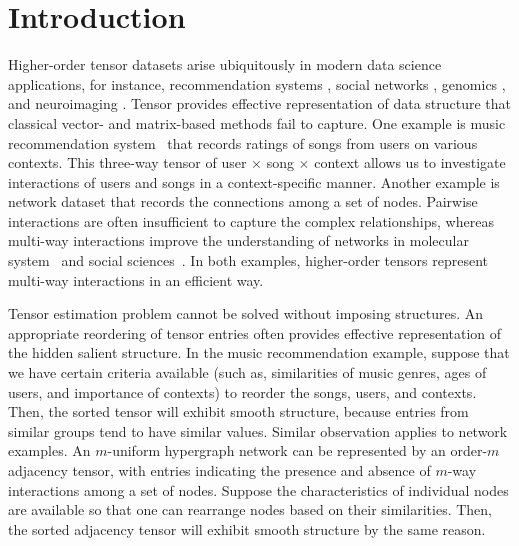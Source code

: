 \documentclass[11pt]{article}
\theoremstyle{definition}
\begin{document}
\clearpage
\section{Introduction}
\label{sec:intro}
Higher-order tensor datasets arise ubiquitously in modern data science applications, for instance, recommendation systems \citep{baltrunas2011incarmusic,bi2018multilayer}, social networks \citep{bickel2009nonparametric},
genomics \citep{hore2016tensor}, and neuroimaging \citep{zhou2013tensor}.
Tensor provides effective representation of data structure that classical vector- and matrix-based methods fail to capture. 
One example is music recommendation system~\citep{baltrunas2011incarmusic} that records ratings of songs from users on various contexts. This three-way tensor of user $\times$ song $\times$ context allows us to investigate interactions of users and songs in a context-specific manner.
Another example is network dataset that records the connections among a set of nodes. Pairwise interactions are often insufficient to capture the complex relationships, whereas multi-way interactions improve the understanding of networks in molecular system~\citep{young2018universality} and social sciences~\citep{wang2019multiway,han2020exact}. In both examples, higher-order tensors represent multi-way interactions in an efficient way.


Tensor estimation problem cannot be solved without imposing structures. An appropriate reordering of tensor entries often provides effective representation of the hidden salient structure. In the music recommendation example, suppose that we have certain criteria available (such as, similarities of music genres, ages of users, and importance of contexts) to reorder the songs, users, and contexts. Then, the sorted tensor will exhibit smooth structure, because entries from similar groups tend to have similar values. Similar observation applies to network examples. An $m$-uniform hypergraph network can be represented by an order-$m$ adjacency tensor, with entries indicating the presence and absence of $m$-way interactions among a set of nodes. Suppose the characteristics of individual nodes are available so that one can rearrange nodes based on their similarities. Then, the sorted adjacency tensor will exhibit smooth structure by the same reason.
\end{document}
